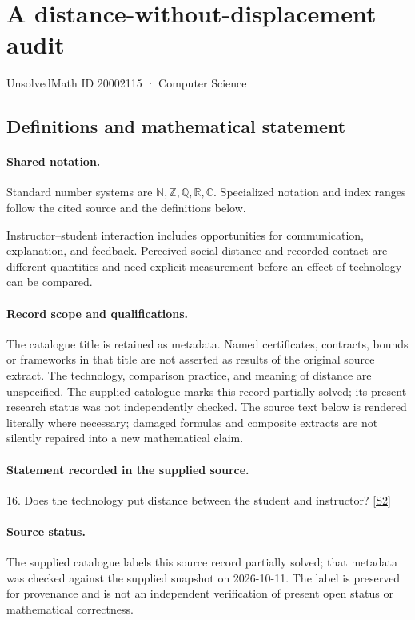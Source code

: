 \documentclass[11pt]{article}
\newcommand{\sref}[2]{\hyperlink{source:#1:#2}{[S#2]}}
\begin{document}
\setcounter{section}{20002114}
\section{A distance-without-displacement audit}\label{20002115}
{\small\sffamily UnsolvedMath ID 20002115 · Computer Science}
\subsection{Definitions and mathematical statement}

\paragraph{Shared notation.}Standard number systems are $\mathbb N,\mathbb Z,\mathbb Q,\mathbb R,\mathbb C$. Specialized notation and index ranges follow the cited source and the definitions below.


Instructor--student interaction includes opportunities for communication, explanation, and feedback. Perceived social distance and recorded contact are different quantities and need explicit measurement before an effect of technology can be compared.
\paragraph{Record scope and qualifications.}
The catalogue title is retained as metadata. Named certificates, contracts, bounds or frameworks in that title are not asserted as results of the original source extract.
The technology, comparison practice, and meaning of distance are unspecified. The supplied catalogue marks this record partially solved; its present research status was not independently checked.
The source text below is rendered literally where necessary; damaged formulas and composite extracts are not silently repaired into a new mathematical claim.
\paragraph{Statement recorded in the supplied source.}
16. Does the technology put distance between the student and instructor? \sref{20002115}{2}
\paragraph{Source status.}
The supplied catalogue labels this source record partially solved; that metadata was checked against the supplied snapshot on 2026-10-11. The label is preserved for provenance and is not an independent verification of present open status or mathematical correctness.
\end{document}
